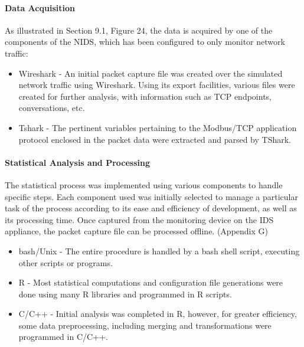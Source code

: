 \documentclass[11pt,]{article}
\begin{document}
\paragraph{Data Acquisition}\label{data-acquisition}

As illustrated in Section 9.1, Figure 24, the data is acquired by one of
the components of the NIDS, which has been configured to only monitor
network traffic:

\begin{itemize}
\itemsep1pt\parskip0pt
\item
  Wireshark - An initial packet capture file was created over the
  simulated network traffic using Wireshark. Using its export
  facilities, various files were created for further analysis, with
  information such as TCP endpoints, conversations, etc.
\item
  Tshark - The pertinent variables pertaining to the Modbus/TCP
  application protocol enclosed in the packet data were extracted and
  parsed by TShark.
\end{itemize}

\paragraph{Statistical Analysis and
Processing}\label{statistical-analysis-and-processing}

The statistical process was implemented using various components to
handle specific steps. Each component used was initially selected to
manage a particular task of the process according to its ease and
efficiency of development, as well as its processing time. Once captured
from the monitoring device on the IDS appliance, the packet capture file
can be processed offline. (Appendix G)

\begin{itemize}
\itemsep1pt\parskip0pt
\item
  bash/Unix - The entire procedure is handled by a bash shell script,
  executing other scripts or programs.
\item
  R - Most statistical computations and configuration file generations
  were done using many R libraries and programmed in R scripts.
\item
  C/C++ - Initial analysis was completed in R, however, for greater
  efficiency, some data preprocessing, including merging and
  transformations were programmed in C/C++.
\end{itemize}

\newpage
\end{document}
